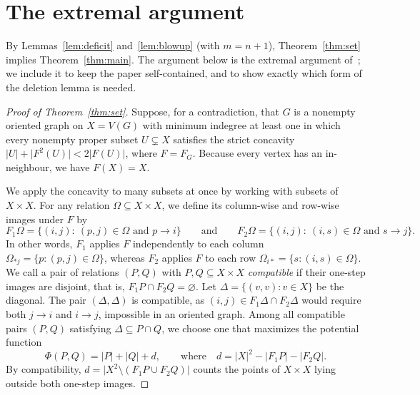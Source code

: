 \documentclass[11pt]{amsart}
\theoremstyle{remark}
\newcommand{\abs}[1]{\lvert #1\rvert}
\begin{document}
\section{The extremal argument}\label{sec:extremal}

By Lemmas~\ref{lem:deficit} and~\ref{lem:blowup} (with $m=n+1$), Theorem~\ref{thm:set} implies Theorem~\ref{thm:main}. The argument below is the extremal argument of~\cite{OAI}; we include it to keep the paper self-contained, and to show exactly which form of the deletion lemma is needed.

\begin{proof}[Proof of Theorem~\ref{thm:set}]
Suppose, for a contradiction, that $G$ is a nonempty oriented graph on $X=V(G)$ with minimum indegree at least one in which every nonempty proper subset $U\subsetneq X$ satisfies the strict concavity $\abs U+\abs{F^2(U)}<2\abs{F(U)}$, where $F=F_G$. Because every vertex has an in-neighbour, we have $F(X)=X$.

We apply the concavity to many subsets at once by working with subsets of $X\times X$. For any relation $\Omega\subseteq X\times X$, we define its column-wise and row-wise images under $F$ by
\[
  F_1\Omega=\{(i,j):\ (p,j)\in\Omega\text{ and }p\to i\}\qquad\text{and}\qquad
  F_2\Omega=\{(i,j):\ (i,s)\in\Omega\text{ and }s\to j\}.
\]
In other words, $F_1$ applies $F$ independently to each column $\Omega_{\ast j}=\{p:(p,j)\in\Omega\}$, whereas $F_2$ applies $F$ to each row $\Omega_{i\ast}=\{s:(i,s)\in\Omega\}$. We call a pair of relations $(P,Q)$ with $P,Q\subseteq X\times X$ \emph{compatible} if their one-step images are disjoint, that is, $F_1P\cap F_2Q=\varnothing$. Let $\Delta=\{(v,v):v\in X\}$ be the diagonal. The pair $(\Delta,\Delta)$ is compatible, as $(i,j)\in F_1\Delta\cap F_2\Delta$ would require both $j\to i$ and $i\to j$, impossible in an oriented graph. Among all compatible pairs $(P,Q)$ satisfying $\Delta\subseteq P\cap Q$, we choose one that maximizes the potential function
\[
  \Phi(P,Q)=\abs P+\abs Q+d,\qquad\text{where}\quad d=\abs X^2-\abs{F_1P}-\abs{F_2Q}.
\]
By compatibility, $d=\abs{X^2\setminus(F_1P\cup F_2Q)}$ counts the points of $X\times X$ lying outside both one-step images.


\end{proof}
\end{document}
